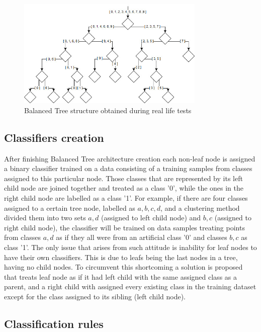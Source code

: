 \begin{figure}[htp]
	\centering
	\includegraphics[width=0.8\textwidth]{Figures/balanced_tree_structure.jpg}
	\caption{Balanced Tree structure obtained during real life tests}
	\label{balanced_tree_structure}\vspace{-3pt}
\end{figure}

\subsection{Classifiers creation}

After finishing Balanced Tree architecture creation each non-leaf node is assigned a binary classifier trained on a data consisting of a training samples from classes assigned to this particular node. Those classes that are represented by its left child node are joined together and treated as a class '0', while the ones in the right child node are labelled as a class '1'. For example, if there are four classes assigned to a certain tree node, labelled as $a, b, c, d$, and a clustering method divided them into two sets $a, d$ (assigned to left child node) and $b, c$ (assigned to right child node), the classifier will be trained on data samples treating points from classes $a, d$ as if they all were from an artificial class '0' and classes $b, c$ as class '1'. The only issue that arises from such attitude is inability for leaf nodes to have their own classifiers. This is due to leafs being the last nodes in a tree, having no child nodes. To circumvent this shortcoming a solution is proposed that treats leaf node as if it had left child with the same assigned class as a parent, and a right child with assigned every existing class in the training dataset except for the class assigned to its sibling (left child node).

\subsection{Classification rules}

